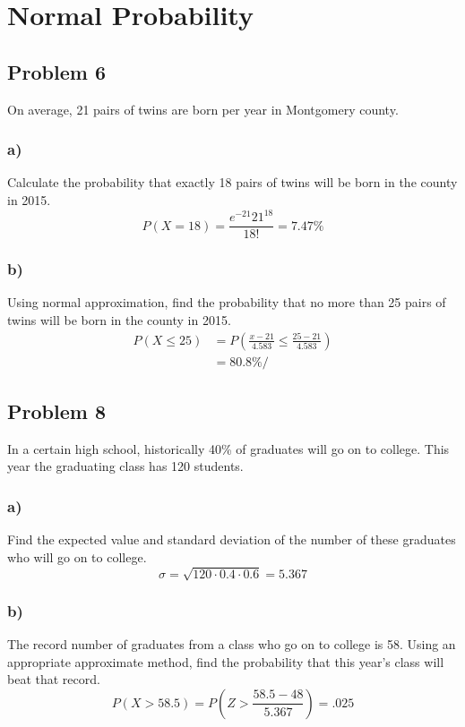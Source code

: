 \documentclass{article}
\begin{document}
\section*{Normal Probability}
\subsection*{Problem 6}
On average, 21 pairs of twins are born per year in Montgomery county.
\subsubsection*{a)}
Calculate the probability that exactly 18 pairs of twins will be born in the county in 2015.
\begin{equation}
    P(X =  18) = \frac{e^{-21}21^{18}}{18!} = 7.47\%
\end{equation}
\subsubsection*{b)}
Using normal approximation, find the probability that no more than 25 pairs of twins will be born in the county in 2015.
\begin{align}
    P( X \leq 25) &= P(\frac{x-21}{4.583} \leq \frac{25-21}{4.583})\\
    &= 80.8\%/
\end{align}
\subsection*{Problem 8}
In a certain high school, historically 40\% of graduates will go on to college. This year the graduating class has 120 students.
\subsubsection*{a)}
Find the expected value and standard deviation of the number of these graduates who will go on to college.
\begin{equation}
    \sigma = \sqrt{120 \cdot 0.4\cdot 0.6} = 5.367
\end{equation}
\subsubsection*{b)}
The record number of graduates from a class who go on to college is 58. Using an appropriate approximate method, find the probability that this year’s class will beat that record.
\begin{equation}
    P(X > 58.5)  = P( Z > \frac{58.5 -48}{5.367}) = .025
\end{equation}
\end{document}
